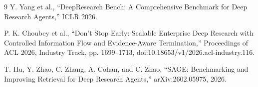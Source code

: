 \documentclass[11pt]{article}
\begin{document}
\begin{thebibliography}{9}
Y. Yang et al., ``DeepResearch Bench: A Comprehensive Benchmark for Deep Research Agents,'' ICLR 2026.

P. K. Choubey et al., ``Don't Stop Early: Scalable Enterprise Deep Research with Controlled Information Flow and Evidence-Aware Termination,'' Proceedings of ACL 2026, Industry Track, pp. 1699--1713, doi:10.18653/v1/2026.acl-industry.116.

T. Hu, Y. Zhao, C. Zhang, A. Cohan, and C. Zhao, ``SAGE: Benchmarking and Improving Retrieval for Deep Research Agents,'' arXiv:2602.05975, 2026.
\end{thebibliography}
\end{document}
